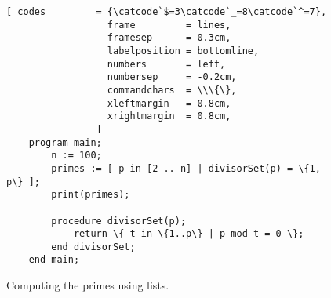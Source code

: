 \begin{figure}[!ht]
  \centering
\begin{Verbatim}[ codes         = {\catcode`$=3\catcode`_=8\catcode`^=7},
                  frame         = lines, 
                  framesep      = 0.3cm, 
                  labelposition = bottomline,
                  numbers       = left,
                  numbersep     = -0.2cm,
                  commandchars  = \\\{\},
                  xleftmargin   = 0.8cm,
                  xrightmargin  = 0.8cm,
                ]
    program main;
        n := 100;
        primes := [ p in [2 .. n] | divisorSet(p) = \{1, p\} ];
        print(primes);

        procedure divisorSet(p);
            return \{ t in \{1..p\} | p mod t = 0 \};
        end divisorSet;
    end main;
\end{Verbatim} 
\vspace*{-0.3cm}
\caption{Computing the primes using lists.}  
\label{fig:primes-tuple.stl}
\end{figure} %

